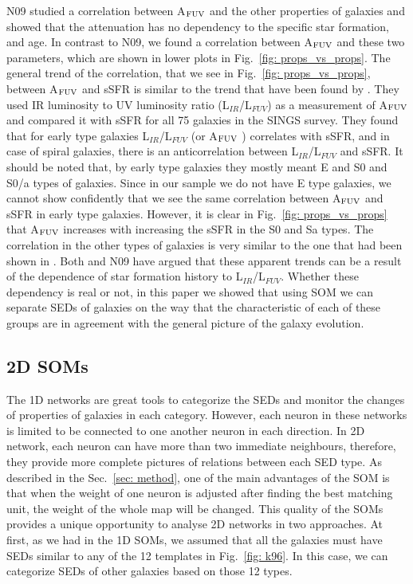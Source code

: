         N09 studied a correlation between A$_{\rm {FUV}}$ and the other properties of galaxies and showed that the attenuation has no dependency to the specific star formation, and age.
        In contrast to N09, we found a correlation between A$_{\rm {FUV}}$ and these two parameters, which are shown in lower plots in Fig.~\ref{fig: props_vs_props}.
        The general trend of the correlation, that we see in Fig.~\ref{fig: props_vs_props}, between A$_{\rm {FUV}}$ and sSFR is similar to the trend that have been found by \cite{Dale07}.
        They used IR luminosity to UV luminosity ratio (L$_{IR}$/L$_{FUV}$) as a measurement of A$_{\rm {FUV}}$ and compared it with sSFR for all 75 galaxies in the SINGS survey.
        They found that for early type galaxies L$_{IR}$/L$_{FUV}$ (or A$_{\rm {FUV}}$ ) correlates with sSFR, and in case of spiral galaxies, there is an anticorrelation between  L$_{IR}$/L$_{FUV}$ and sSFR.
        It should be noted that, by early type galaxies they mostly meant E and S0 and S0/a types of galaxies.
        Since in our sample we do not have E type galaxies, we cannot show confidently that we see the same correlation between A$_{\rm {FUV}}$ and sSFR in early type galaxies. 
        However, it is clear in Fig.~\ref{fig: props_vs_props} that A$_{\rm {FUV}}$ increases with increasing the sSFR in the S0 and Sa types.
        The correlation in the other types of galaxies is very similar to the one that had been shown in \cite{Dale07}.
        Both \cite{Dale07} and N09 have argued that these apparent trends can be a result of the dependence of star formation history to L$_{IR}$/L$_{FUV}$.
        Whether these dependency is real or not, in this paper we showed that using SOM we can separate SEDs of galaxies on the way that the characteristic of each of these groups are in agreement with the general picture of the galaxy evolution.
        
        
    \subsection{2D SOMs}
    \label{sec: 2D}
    The 1D networks are great tools to categorize the SEDs and monitor the changes of properties of galaxies in each category.
    However, each neuron in these networks is limited to be connected to one another neuron in each direction.
    In 2D network, each neuron can have more than two immediate neighbours, therefore, they provide more complete pictures of relations between each SED type.
    As described in the Sec.~\ref{sec: method}, one of the main advantages of the SOM is that when the weight of one neuron is adjusted after finding the best matching unit, the weight of the whole map will be changed.
    This quality of the SOMs provides a unique opportunity to analyse 2D networks in two approaches. 
    At first, as we had in the 1D SOMs, we assumed that all the galaxies must have SEDs similar to any of the 12 templates in Fig.~\ref{fig: k96}.
    In this case, we can categorize SEDs of other galaxies based on those 12 types.
    
